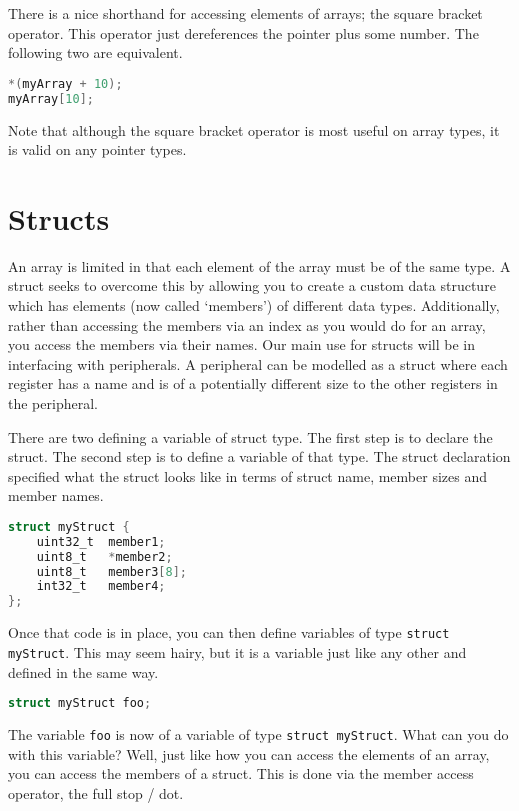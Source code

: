 There is a nice shorthand for accessing elements of arrays; the square bracket operator. This operator just dereferences the pointer plus some number. The following two are equivalent. 
\begin{lstlisting}[language=C]
*(myArray + 10);
myArray[10];
\end{lstlisting}

Note that although the square bracket operator is most useful on array types, it is valid on any pointer types. 

\section{Structs}
An array is limited in that each element of the array must be of the same type. A struct seeks to overcome this by allowing you to create a custom data structure which has elements (now called `members') of different data types. Additionally, rather than accessing the members via an index as you would do for an array, you access the members via their names. 
Our main use for structs will be in interfacing with peripherals.
A peripheral can be modelled as a struct where each register has a name and is of a potentially different size to the other registers in the peripheral.

There are two defining a variable of struct type.
The first step is to declare the struct. The second step is to define a variable of that type.
The struct declaration specified what the struct looks like in terms of struct name, member sizes and member names.

\begin{lstlisting}[language=C]
struct myStruct {
    uint32_t  member1;
    uint8_t   *member2;
    uint8_t   member3[8];
    int32_t   member4; 
};
\end{lstlisting}

Once that code is in place, you can then define variables of type \texttt{struct myStruct}. This may seem hairy, but it is a variable just like any other and defined in the same way.

\begin{lstlisting}[language=C]
struct myStruct foo;
\end{lstlisting}

The variable \texttt{foo} is now of a variable of type \texttt{struct myStruct}. What can you do with this variable? Well, just like how you can access the elements of an array, you can access the members of a struct. This is done via the member access operator, the full stop / dot. 

